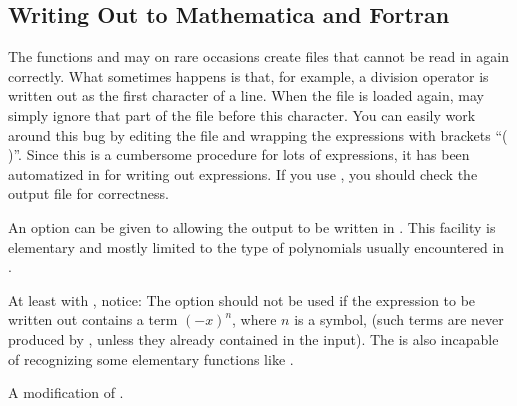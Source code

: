 \subsection{Writing Out to Mathematica and Fortran%
}
\label{write2}

The \mma functions  and  may on rare occasions create files 
that cannot  be read in again correctly. What sometimes happens is that, for 
example, a division operator is written out as the first character of a line.
When the file is loaded again, \mma may simply ignore that part  of the file
before this character.
You can easily work around this bug 
by editing the file and wrapping  
the expressions with brackets ``( )''. Since this is a cumbersome
procedure for lots of expressions, it has been automatized in 
 for writing out expressions. 
If you use , you should check 
the output file for correctness.

An option can be given to  allowing the 
output to be written in 
. This facility is elementary and mostly limited to the 
type of polynomials usually encountered in \fc. 

At least with , notice:
The  option should not be used if the expression to be 
written out contains a term $(-x)^n$, where $n$ is a symbol, (such terms are never
produced by \fc, unless they already contained in the input).
The \mma {} is also incapable of recognizing some elementary 
functions like .

 {A modification of .}


